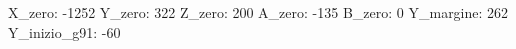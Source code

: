 X_zero:     -1252
Y_zero:       322
Z_zero:       200
A_zero:      -135
B_zero:         0
Y_margine:    262
Y_inizio_g91: -60